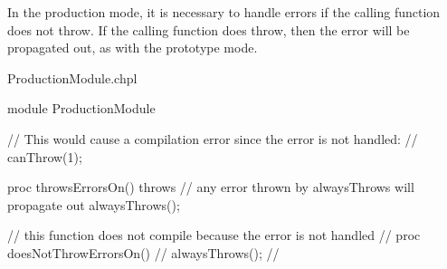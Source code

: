 In the production mode, it is necessary to handle errors if the
calling function does not throw. If the calling function does
throw, then the error will be propagated out, as with the prototype mode.

\begin{chapelexample}{ProductionModule.chpl}
\begin{chapel}
module ProductionModule {
  // This would cause a compilation error since the error is not handled:
  // canThrow(1);

  proc throwsErrorsOn() throws {
    // any error thrown by alwaysThrows will propagate out
    alwaysThrows();
  }

  // this function does not compile because the error is not handled
  // proc doesNotThrowErrorsOn() {
  //   alwaysThrows();
  // }
}
\end{chapel}
\end{chapelexample}
